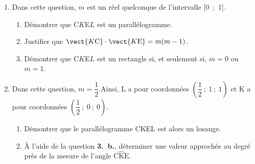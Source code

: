 \begin{enumerate}[resume]
\item Dans cette question, $m$ est un réel quelconque de l'intervalle [0~;~1].
	\begin{enumerate}
		\item Démontrer que C$K$E$L$ est un parallélogramme.
		\item Justifier que $\vect{K\text{C}} \cdot \vect{K\text{E}} = m(m - 1)$.
		\item Démontrer que C$K$E$L$ est un rectangle si, et seulement si, $m = 0$ ou $m = 1$.
	\end{enumerate}
\item Dans cette question, $m = \dfrac12$.Ainsi, L a pour coordonnées 
$\left(\dfrac12~;~1~;~1\right)$ et K a pour coordonnées $\left(\dfrac12~;~0~;~0\right)$.
	\begin{enumerate}
		\item Démontrer que le parallélogramme CKEL est alors un losange.
		\item À l'aide de la question \textbf{3.~b.}, déterminer une valeur approchée au degré près de la mesure de l'angle $\widehat{\text{CKE}}$.
	\end{enumerate}
\end{enumerate}
